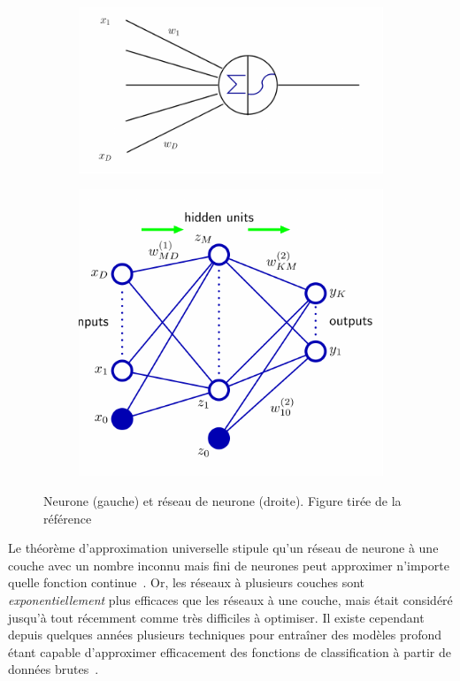 \begin{figure}[h]
  \centering
  \begin{subfigure}{.5\textwidth}
    \includegraphics[width=\textwidth]{neuron.pdf}
    \label{fig:sub1}
  \end{subfigure}%
  \begin{subfigure}{.5\textwidth}
    \includegraphics[width=\textwidth]{NN.pdf}
    \label{fig:sub2}
  \end{subfigure}
  \caption{Neurone (gauche) et réseau de neurone (droite). Figure tirée de la référence~\cite{bishop_pattern_2006}}
  \label{fig:nn}
\end{figure}

Le théorème d'approximation universelle stipule qu'un réseau de
neurone à une couche avec un nombre inconnu mais fini de neurones
peut approximer n'importe quelle fonction
continue~\cite{hornik_approximation_1991}. Or, les réseaux à plusieurs
couches sont \emph{exponentiellement} plus efficaces que les réseaux à
une couche, mais était considéré jusqu'à tout récemment comme très
difficiles à optimiser. Il existe cependant depuis quelques années
plusieurs techniques pour entraîner des modèles profond étant capable
d'approximer efficacement des fonctions de classification à partir de
données brutes~\cite{lecun_deep_2015}.

